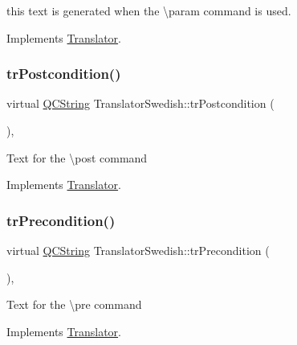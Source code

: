 this text is generated when the \textbackslash{}param command is used. 

Implements \mbox{\hyperlink{class_translator}{Translator}}.

\mbox{\label{class_translator_swedish_a9fb548c4d7b0a08f31b79bb45281d19c}} 
\subsubsection{\texorpdfstring{trPostcondition()}{trPostcondition()}}
{\footnotesize\ttfamily virtual \mbox{\hyperlink{class_q_c_string}{Q\+C\+String}} Translator\+Swedish\+::tr\+Postcondition (\begin{DoxyParamCaption}{ }\end{DoxyParamCaption})\hspace{0.3cm}{\ttfamily [inline]}, {\ttfamily [virtual]}}

Text for the \textbackslash{}post command 

Implements \mbox{\hyperlink{class_translator}{Translator}}.

\mbox{\label{class_translator_swedish_a470913f5a0464243ce6586747d227381}} 
\subsubsection{\texorpdfstring{trPrecondition()}{trPrecondition()}}
{\footnotesize\ttfamily virtual \mbox{\hyperlink{class_q_c_string}{Q\+C\+String}} Translator\+Swedish\+::tr\+Precondition (\begin{DoxyParamCaption}{ }\end{DoxyParamCaption})\hspace{0.3cm}{\ttfamily [inline]}, {\ttfamily [virtual]}}

Text for the \textbackslash{}pre command 

Implements \mbox{\hyperlink{class_translator}{Translator}}.

\mbox{\label{class_translator_swedish_a9f9b7d36b165e24c2d3228629a31ed3a}} 
